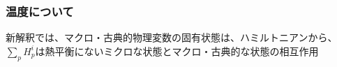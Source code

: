 \subsubsection{温度について}
新解釈では、マクロ・古典的物理変数の固有状態は、ハミルトニアンから、$\sum_p H_p^i$は熱平衡にないミクロな状態とマクロ・古典的な状態の相互作用